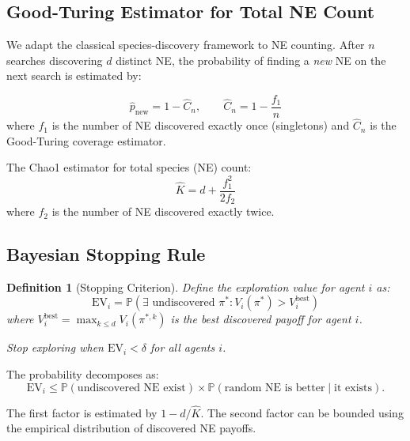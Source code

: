 \documentclass[11pt,a4paper]{article}
\newtheorem{definition}[theorem]{Definition}
\newcommand{\Prob}{\mathbb{P}}
\begin{document}
\subsection{Good-Turing Estimator for Total NE Count}

We adapt the classical species-discovery framework to NE counting.
After $n$ searches discovering $d$ distinct NE, the probability of
finding a \emph{new} NE on the next search is estimated by:

\begin{equation}\label{eq:coverage}
    \hat{p}_{\text{new}} = 1 - \hat{C}_n, \qquad
    \hat{C}_n = 1 - \frac{f_1}{n}
\end{equation}
where $f_1$ is the number of NE discovered exactly once (singletons)
and $\hat{C}_n$ is the Good-Turing coverage estimator.

The Chao1 estimator for total species (NE) count:
\begin{equation}
    \hat{K} = d + \frac{f_1^2}{2 f_2}
\end{equation}
where $f_2$ is the number of NE discovered exactly twice.

\subsection{Bayesian Stopping Rule}

\begin{definition}[Stopping Criterion]
Define the \emph{exploration value} for agent $i$ as:
\begin{equation}
    \text{EV}_i = \Prob(\exists \text{ undiscovered } \pi^* : V_i(\pi^*) > V_i^{\text{best}})
\end{equation}
where $V_i^{\text{best}} = \max_{k \leq d} V_i(\pi^{*,k})$ is the best
discovered payoff for agent $i$.

Stop exploring when $\text{EV}_i < \delta$ for all agents $i$.
\end{definition}

The probability decomposes as:
\begin{equation}
    \text{EV}_i \leq \Prob(\text{undiscovered NE exist}) \times
    \Prob(\text{random NE is better} \mid \text{it exists}).
\end{equation}

The first factor is estimated by $1 - d/\hat{K}$. The second factor
can be bounded using the empirical distribution of discovered NE payoffs.


\end{document}
